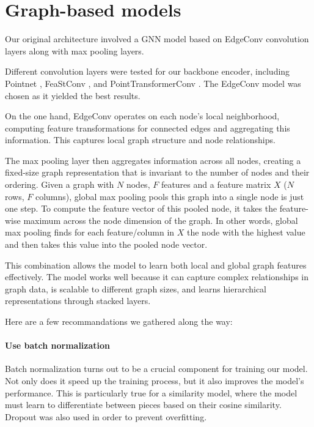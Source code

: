 \section{Graph-based models}

Our original architecture involved a GNN model based on EdgeConv \cite{wangDynamicGraphCNN2019} convolution layers along with max pooling layers. 

Different convolution layers were tested for our backbone encoder, including Pointnet \cite{qiPointNetDeepHierarchical2017}, FeaStConv \cite{vermaFeaStNetFeatureSteeredGraph2018}, and PointTransformerConv \cite{zhaoPointTransformer2021}. The EdgeConv model was chosen as it yielded the best results.


On the one hand, EdgeConv operates on each node's local neighborhood, computing feature transformations for connected edges and aggregating this information. This captures local graph structure and node relationships. 

The max pooling layer then aggregates information across all nodes, creating a fixed-size graph representation that is invariant to the number of nodes and their ordering.
Given a graph with $N$ nodes, $F$ features and a feature matrix $X$ ($N$ rows, $F$ columns), global max pooling pools this graph into a single node is just one step. To compute the feature vector of this pooled node, it takes the feature-wise maximum across the node dimension of the graph. In other words, global max pooling finds for each feature/column in $X$ the node with the highest value and then takes this value into the pooled node vector. 

This combination allows the model to learn both local and global graph features effectively. The model works well because it can capture complex relationships in graph data, is scalable to different graph sizes, and learns hierarchical representations through stacked layers.

Here are a few recommandations we gathered along the way:

\paragraph{Use batch normalization}

Batch normalization \cite{ioffeBatchNormalizationAccelerating2015} turns out to be a crucial component for training our model. Not only does it speed up the training process, but it also improves the model's performance. This is particularly true for a similarity model, where the model must learn to differentiate between pieces based on their cosine similarity. Dropout was also used in order to prevent overfitting.

